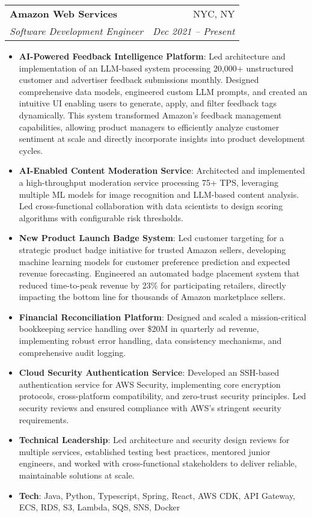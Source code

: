 \documentclass[letterpaper,11pt]{article}
\makeatletter
\newcommand{\resumeItem}[2]{
  \item\small{
    \textbf{#1}{: #2 \vspace{-2pt}}
  }
}
\newcommand{\resumeSubheading}[4]{
  \vspace{-1pt}\item
    \begin{tabular*}{0.97\textwidth}[t]{l@{\extracolsep{\fill}}r}
      \textbf{#1} & #2 \\
      \textit{\small#3} & \textit{\small #4} \\
    \end{tabular*}\vspace{-5pt}
}
\newcommand{\resumeItemListStart}{\begin{itemize}}
\newcommand{\resumeItemListEnd}{\end{itemize}\vspace{-5pt}}
\makeatother
\begin{document}
  \resumeSubheading
    {Amazon Web Services}{NYC, NY}
    {Software Development Engineer}{Dec 2021 -- Present}
    \resumeItemListStart
      \resumeItem{AI-Powered Feedback Intelligence Platform}
        {Led architecture and implementation of an LLM-based system processing 20,000+ unstructured customer and advertiser feedback submissions monthly. Designed comprehensive data models, engineered custom LLM prompts, and created an intuitive UI enabling users to generate, apply, and filter feedback tags dynamically. This system transformed Amazon's feedback management capabilities, allowing product managers to efficiently analyze customer sentiment at scale and directly incorporate insights into product development cycles.}
      \resumeItem{AI-Enabled Content Moderation Service}
        {Architected and implemented a high-throughput moderation service processing 75+ TPS, leveraging multiple ML models for image recognition and LLM-based content analysis. Led cross-functional collaboration with data scientists to design scoring algorithms with configurable risk thresholds.}
      \resumeItem{New Product Launch Badge System}
        {Led customer targeting for a strategic product badge initiative for trusted Amazon sellers, developing machine learning models for customer preference prediction and expected revenue forecasting. Engineered an automated badge placement system that reduced time-to-peak revenue by 23\% for participating retailers, directly impacting the bottom line for thousands of Amazon marketplace sellers.}
      \resumeItem{Financial Reconciliation Platform}
        {Designed and scaled a mission-critical bookkeeping service handling over \$20M in quarterly ad revenue, implementing robust error handling, data consistency mechanisms, and comprehensive audit logging.}
      \resumeItem{Cloud Security Authentication Service}
        {Developed an SSH-based authentication service for AWS Security, implementing core encryption protocols, cross-platform compatibility, and zero-trust security principles. Led security reviews and ensured compliance with AWS's stringent security requirements.}
      \resumeItem{Technical Leadership}
        {Led architecture and security design reviews for multiple services, established testing best practices, mentored junior engineers, and worked with cross-functional stakeholders to deliver reliable, maintainable solutions at scale.}
      \resumeItem{Tech}
        {Java, Python, Typescript, Spring, React, AWS CDK, API Gateway, ECS, RDS, S3, Lambda, SQS, SNS, Docker}
    \resumeItemListEnd
      
\end{document}
